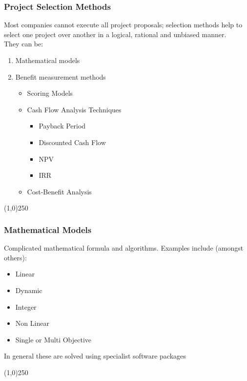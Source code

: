 \begin{frame}
\frametitle{Project Selection Methods}
Most companies cannot execute all project proposals; selection methods help to select one project over another in a logical, rational and unbiased manner.\\
They can be:
\begin{enumerate}
	\item Mathematical models    
	\item Benefit measurement methods
\begin{itemize}
	\item Scoring Models
	\item Cash Flow Analysis Techniques    
		\begin{itemize}
			\item Payback Period
			\item Discounted Cash Flow
			\item NPV
			\item IRR
		\end{itemize}
	\item Cost-Benefit Analysis    
\end{itemize}
\end{enumerate}
	
\end{frame}\begin{center}\line(1,0){250}\end{center}
%
%
\begin{frame}
\frametitle{Mathematical Models}
Complicated mathematical formula and algorithms.  Examples include (amongst others):
\begin{itemize}
	\item Linear 
	\item Dynamic
	\item Integer
	\item Non Linear
	\item Single or Multi Objective
\end{itemize}
In general these are solved using specialist software packages
\end{frame}\begin{center}\line(1,0){250}\end{center}
%
%

